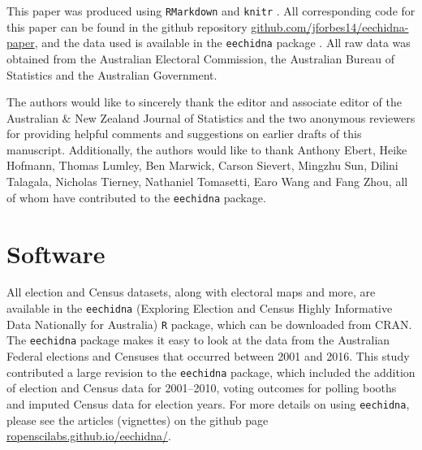 \documentclass[times, doublespace]{anzsauth}
\begin{document}
This paper was produced using \texttt{RMarkdown} \citep{rmarkdown} and \texttt{knitr} \citep{knitr}. All corresponding code for this paper can be found in the github repository \href{https://github.com/jforbes14/eechidna-paper}{github.com/jforbes14/eechidna-paper}, and the data used is available in the \texttt{eechidna} package \citep{eechidna}. All raw data was obtained from the Australian Electoral Commission, the Australian Bureau of Statistics and the Australian Government.

The authors would like to sincerely thank the editor and associate editor of the Australian \& New Zealand Journal of Statistics and the two anonymous reviewers for providing helpful comments and suggestions on earlier drafts of this manuscript. Additionally, the authors would like to thank Anthony Ebert, Heike Hofmann, Thomas Lumley, Ben Marwick, Carson Sievert, Mingzhu Sun, Dilini Talagala, Nicholas Tierney, Nathaniel Tomasetti, Earo Wang and Fang Zhou, all of whom have contributed to the \texttt{eechidna} package.

\hypertarget{software}{%
\section{Software}\label{software}}

All election and Census datasets, along with electoral maps and more, are available in the \texttt{eechidna} (Exploring Election and Census Highly Informative Data Nationally for Australia) \texttt{R} package, which can be downloaded from CRAN. The \texttt{eechidna} package makes it easy to look at the data from the Australian Federal elections and Censuses that occurred between 2001 and 2016. This study contributed a large revision to the \texttt{eechidna} package, which included the addition of election and Census data for 2001--2010, voting outcomes for polling booths and imputed Census data for election years. For more details on using \texttt{eechidna}, please see the articles (vignettes) on the github page \href{https://ropenscilabs.github.io/eechidna/}{ropenscilabs.github.io/eechidna/}.

\renewcommand\refname{References}

\end{document}
